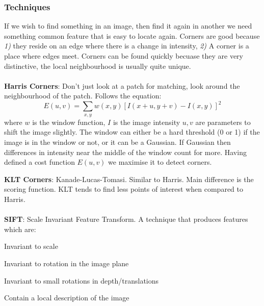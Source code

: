 \documentclass[8pt]{extarticle}
\begin{document}
\begin{multicols}{2}
\subsubsection{Techniques}
If we wish to find something in an image, then find it again in another we need something common feature that is easy to locate again. Corners are good because \textit{1)} they reside on an edge where there is a change in intensity, \textit{2)} A corner is a place where edges meet. Corners can be found quickly becuase they are very distinctive, the local neighbourhood is usually quite unique.
\\ \\
\textbf{Harris Corners}: Don't just look at a patch for matching, look around the neighbourhood of the patch. Follows the equation:
\begin{equation}
    E(u,v) = \sum\limits_{x,y} w(x,y)[I(x+u, y+v) - I(x,y)]^2
\end{equation}
where $w$ is the window function, $I$ is the image intensity $u,v$ are parameters to shift the image slightly. The window can either be a hard threshold (0 or 1) if the image is in the window or not, or it can be a Gaussian. If Gaussian then differences in intensity near the middle of the window count for more. Having defined a cost function $E(u,v)$ we maximise it to detect corners.

\textbf{KLT Corners}: Kanade-Lucas-Tomasi. Similar to Harris. Main difference is the scoring function. KLT tends to find less points of interest when compared to Harris.
\\ \\
\textbf{SIFT}: Scale Invariant Feature Transform. A technique that produces features which are:
\begin{compactitem}
    \item Invariant to scale
    \item Invariant to rotation in the image plane
    \item Invariant to small rotations in depth/translations
    \item Contain a local description of the image
\end{compactitem}


\end{multicols}
\end{document}
